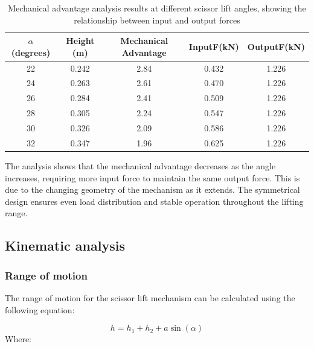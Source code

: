 \documentclass[../../main]{subfiles}
\begin{document}
\begin{table}[h!]
  \centering
  \begin{tcolorbox}[
    colback=red!5!white,colframe=red!75!black,
    title={\textbf{Mechanical advantage analysis}},
    fonttitle=\bfseries, coltitle=white, width=0.98\linewidth]
  \begin{tabular}{|c|c|c|c|c|}
      \hline \rowcolor{red!20}
      $\alpha$ (degrees) & Height (m) & Mechanical Advantage &InputF(kN) & OutputF(kN) \\ \hline
      22 & 0.242 & 2.84 & 0.432 & 1.226 \\ \hline
      24 & 0.263 & 2.61 & 0.470 & 1.226 \\ \hline
      26 & 0.284 & 2.41 & 0.509 & 1.226 \\ \hline
      28 & 0.305 & 2.24 & 0.547 & 1.226 \\ \hline
      30 & 0.326 & 2.09 & 0.586 & 1.226 \\ \hline
      32 & 0.347 & 1.96 & 0.625 & 1.226 \\ \hline
  \end{tabular}
\end{tcolorbox}
  \caption[Mechanical Advantage Analysis]{Mechanical advantage analysis results at different scissor lift angles, showing the relationship between input and output forces}
  \label{tab:mechanical_advantage}
\end{table}


The analysis shows that the mechanical advantage decreases as the angle
increases, requiring more input force to maintain the same output force.
This is due to the changing geometry of the mechanism as it extends. The
symmetrical design ensures even load distribution and stable operation
throughout the lifting range.
\newpage
\subsection{Kinematic analysis}\label{kinematic-analysis}

\subsubsection{Range of motion}

The range of motion for the scissor lift mechanism can be calculated
using the following equation:

\begin{equation}
  h = h_1 + h_2 + a \sin(\alpha)
\end{equation}
Where:
\end{document}
